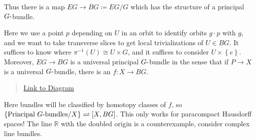 \begin{remark}

Thus there is a map \(EG \to BG \coloneqq EG/G\) which has the structure
of a principal \(G{\hbox{-}}\)bundle.

\begin{figure}
\centering
{}
\end{figure}

Here we use a point \(p\) depending on \(U\) in an orbit to identify
orbits \(g\cdot p\) with \(g\), and we want to take transverse slices to
get local trivializations of \(U\in BG\). It suffices to know where
\(\pi ^{-1} (U) \cong U \times G\), and it suffices to consider
\(U \times\left\{{e}\right\}\). Moreover, \(EG\to BG\) is a universal
principal \(G{\hbox{-}}\)bundle in the sense that if \(P\to X\) is a
universal \(G{\hbox{-}}\)bundle, there is an \(f:X\to BG\).

\begin{center}
\end{center}

\begin{quote}
\href{https://q.uiver.app/?q=WzAsNCxbMCwyLCJYIl0sWzIsMCwiRUciXSxbMiwyLCJCRyJdLFswLDAsIlAiXSxbMywwXSxbMCwyLCJmIl0sWzEsMl0sWzMsMSwiIiwyLHsic3R5bGUiOnsiYm9keSI6eyJuYW1lIjoiZGFzaGVkIn19fV1d}{Link
to Diagram}
\end{quote}

Here bundles will be classified by homotopy classes of \(f\), so
\(\left\{{\text{Principal $G{\hbox{-}}$bundles} / X}\right\} \rightleftharpoons[X, BG]\).
This only works for paracompact Hausdorff spaces! The line
\({\mathbb{R}}\) with the doubled origin is a counterexample, consider
complex line bundles.

\end{remark}


